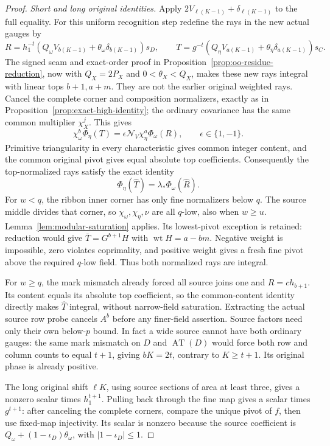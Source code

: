 \documentclass[11pt,a4paper]{amsart}
\numberwithin{equation}{section}
\theoremstyle{plain}
\theoremstyle{definition}
\begin{document}
\begin{proof}
\emph{Short and long original identities.}
Apply \(2V_{\ell(K-1)}+\delta_{\ell(K-1)}\) to the full equality.  For this uniform recognition step redefine the rays in the new actual gauges by
\[
 R=h_1^{-t}(Q_\omega V_{b(K-1)}+\theta_\omega\delta_{b(K-1)})s_D,
 \qquad
 T=g^{-t}(Q_\eta V_{a(K-1)}+\theta_\eta\delta_{a(K-1)})s_C.
\]
The signed seam and exact-order proof in Proposition~\ref{prop:oo-residue-reduction}, now with \(Q_X=2P_X\) and \(0<\theta_X<Q_X\), makes these new rays integral with linear tops \(b+1,a+m\).  They are not the earlier original weighted rays.  Cancel the complete corner and composition normalizers, exactly as in Proposition~\ref{prop:exact-high-identity}; the ordinary covariance has the same common multiplier \(\chi_X^j\).  This gives
\[
 \chi_\omega^b\Phi_\eta(T)
 =\epsilon\mathcal N_V\chi_\eta^a\Phi_\omega(R),
 \qquad\epsilon\in\{1,-1\}.
\]
Primitive triangularity in every characteristic gives common integer content, and the common original pivot gives equal absolute top coefficients.  Consequently the top-normalized rays satisfy the exact identity
\[
 \Phi_\eta(\widehat T)=\lambda_*\Phi_\omega(\widehat R).
\]
For \(w<q\), the ribbon inner corner has only fine normalizers below \(q\).  The source middle divides that corner, so \(\chi_\omega,\chi_\eta,\nu\) are all \(q\)-low, also when \(w\ge u\).  Lemma~\ref{lem:modular-saturation} applies.  Its lowest-pivot exception is retained: reduction would give \(\bar T=G^{b+1}H\) with \(\operatorname{wt}H=a-bm\).  Negative weight is impossible, zero violates coprimality, and positive weight gives a fresh fine pivot above the required \(q\)-low field.  Thus both normalized rays are integral.

For \(w\ge q\), the mark mismatch already forced all source joins one and \(R=c h_{b+1}\).  Its content equals its absolute top coefficient, so the common-content identity directly makes \(\widehat T\) integral, without narrow-field saturation.  Extracting the actual source row probe cancels \(A^b\) before any finer-field assertion.  Source factors need only their own below-\(p\) bound.  In fact a wide source cannot have both ordinary gauges: the same mark mismatch on \(D\) and \(\operatorname{AT}(D)\) would force both row and column counts to equal \(t+1\), giving \(bK=2t\), contrary to \(K\ge t+1\).  Its original phase is already positive.

The long original shift \(\ell K\), using source sections of area at least three, gives a nonzero scalar times \(h_1^{t+1}\).  Pulling back through the fine map gives a scalar times \(g^{t+1}\): after canceling the complete corners, compare the unique pivot of \(f\), then use fixed-map injectivity.  Its scalar is nonzero because the source coefficient is \(Q_\omega+(1-\iota_D)\theta_\omega\), with \(|1-\iota_D|\le1\).


\end{proof}
\end{document}
